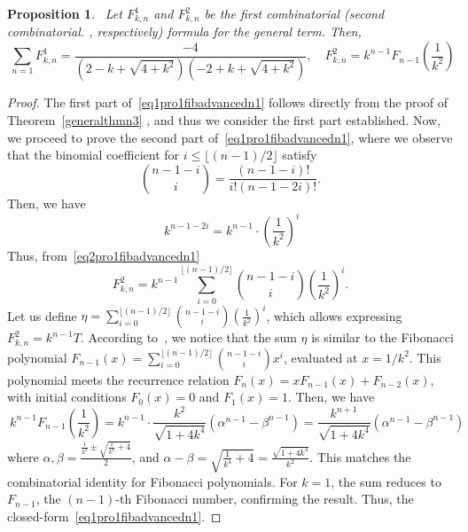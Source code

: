 \documentclass[11pt, a4paper]{article}
\newtheorem{proposition}{Proposition}[section]
\theoremstyle{definition}
\begin{document}
\begin{proposition}~\label{pro1fibadvancedn1}
Let $F^{1}_{k,n}$ and $F^{2}_{k,n}$ be the first combinatorial (second combinatorial. , respectively) formula for the general term. Then,
\begin{equation}~\label{eq1pro1fibadvancedn1}
\sum_{n=1}^{} F^{1}_{k,n}=\frac{-4}{(2-k+\sqrt{4+k^2})(-2+k+\sqrt{4+k^2})}, \quad  F^{2}_{k,n}=k^{n-1} F_{n-1} \left( \frac{1}{k^2} \right)
\end{equation}
\end{proposition}
\begin{proof}
The first part of~\eqref{eq1pro1fibadvancedn1} follows directly from the proof of Theorem~\ref{generalthmn3} , and thus we consider the first part established. Now, we proceed to prove the second part of~\eqref{eq1pro1fibadvancedn1}, where we observe that the binomial coefficient for $i \leq \lfloor (n-1)/2 \rfloor$ satisfy 
\[
\binom{n-1-i}{i} = \frac{(n-1-i)!}{i! (n-1-2i)!}.
\]
Then, we have 
\begin{equation}~\label{eq2pro1fibadvancedn1}
k^{n-1-2i} = k^{n-1} \cdot \left( \frac{1}{k^2} \right)^i 
\end{equation}
Thus, from~\eqref{eq2pro1fibadvancedn1}
\[
F^{2}_{k,n}= k^{n-1} \sum_{i=0}^{\lfloor (n-1)/2 \rfloor} \binom{n-1-i}{i} \left( \frac{1}{k^2} \right)^i.
\]
Let us define $\eta = \sum_{i=0}^{\lfloor (n-1)/2 \rfloor} \binom{n-1-i}{i} \left(\frac{1}{k^2}\right)^i$, which allows expressing $F^{2}_{k,n} = k^{n-1} T$. According to~\cite{Mehraban2006Gulliver}, we notice that the sum $\eta$ is similar to the Fibonacci polynomial $F_{n-1}(x) = \sum_{i=0}^{\lfloor (n-1)/2 \rfloor} \binom{n-1-i}{i} x^i$, evaluated at $x = 1/k^2$. This polynomial meets the recurrence relation $F_n(x) = x F_{n-1}(x) + F_{n-2}(x)$, with initial conditions $F_0(x) = 0$ and $F_1(x) = 1$. Then, we have 
\begin{equation}~\label{eq3pro1fibadvancedn1}
k^{n-1} F_{n-1} \left( \frac{1}{k^2} \right) = k^{n-1} \cdot \frac{k^2}{\sqrt{1 + 4k^4}} \left( \alpha^{n-1} - \beta^{n-1} \right) = \frac{k^{n+1}}{\sqrt{1 + 4k^4}} \left( \alpha^{n-1} - \beta^{n-1} \right)
\end{equation}
where $\alpha, \beta = \frac{\frac{1}{k^2} \pm \sqrt{\frac{1}{k^4} + 4}}{2}$, and $\alpha - \beta = \sqrt{\frac{1}{k^4} + 4} = \frac{\sqrt{1 + 4k^4}}{k^2}$. This matches the combinatorial identity for Fibonacci polynomials. For $k=1$, the sum reduces to $F_{n-1}$, the $(n-1)$-th Fibonacci number, confirming the result. Thus, the closed-form~\eqref{eq1pro1fibadvancedn1}. 
\end{proof}
\end{document}
